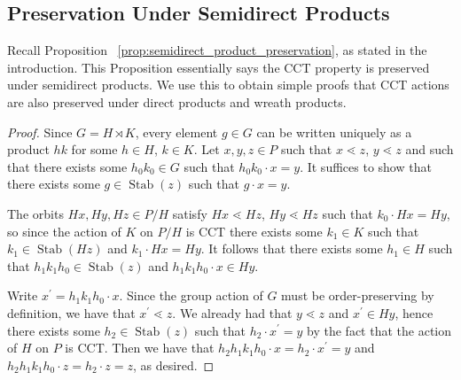 \documentclass[10 pt]{amsart}
\theoremstyle{plain}
\theoremstyle{definition}
\theoremstyle{remark}
\numberwithin{equation}{section}
\newcommand\ssec{\subsection}
\def\Stab{\operatorname{Stab}}
\begin{document}
\ssec{Preservation Under Semidirect Products}
\label{ssec:semidirect_product_preservation}
Recall Proposition ~\ref{prop:semidirect_product_preservation}, as stated in the introduction. This Proposition essentially says the CCT property is preserved under semidirect products. We use this to obtain simple proofs that CCT actions are also preserved under direct products and wreath products.

\semidirect*

\begin{proof}
Since $G = H\rtimes K$, every element $g\in G$ can be written uniquely as a product $hk$ for some $h\in H$, $k\in K$.  Let $x,y,z\in P$ such that $x\lessdot z$, $y\lessdot z$ and such that there exists some $h_0k_0\in G$ such that $h_0k_0\cdot x = y$.  It suffices to show that there exists some $g\in \Stab(z)$ such that $g\cdot x = y$.

The orbits $Hx, Hy, Hz\in P/H$ satisfy $Hx\lessdot Hz$, $Hy\lessdot Hz$ such that $k_0\cdot Hx = Hy$, so since the action of $K$ on $P/H$ is CCT there exists some $k_1\in K$ such that $k_1\in \Stab(Hz)$ and $k_1\cdot Hx = Hy$.  It follows that there exists some $h_1\in H$ such that $h_1k_1h_0\in \Stab(z)$ and $h_1k_1h_0\cdot x\in Hy$.

Write $x^\prime = h_1k_1h_0\cdot x$.  Since the group action of $G$ must be order-preserving by definition, we have that $x^\prime \lessdot z$.  We already had that $y\lessdot z$ and $x^\prime\in Hy$, hence there exists some $h_2\in \Stab(z)$ such that $h_2\cdot x^\prime = y$ by the fact that the action of $H$ on $P$ is CCT.  Then we have that $h_2h_1k_1h_0\cdot x = h_2\cdot x^\prime = y$ and $h_2h_1k_1h_0\cdot z = h_2\cdot z = z$, as desired.
\end{proof}
\end{document}
